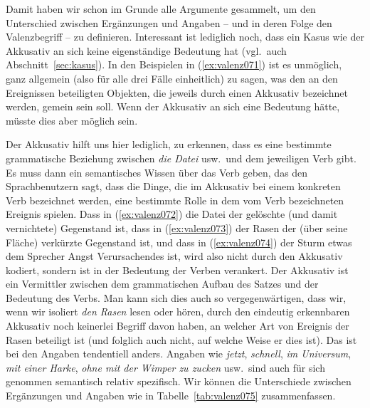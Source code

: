 \begin{exe}
  \ex\label{ex:valenz070}
  \begin{xlist}
  \end{xlist}
\end{exe}


Damit haben wir schon im Grunde alle Argumente gesammelt, um den Unterschied zwischen Ergänzungen und Angaben -- und in deren Folge den Valenzbegriff -- zu definieren.
Interessant ist lediglich noch, dass ein Kasus wie der Akkusativ an sich keine eigenständige Bedeutung hat (vgl.\ auch Abschnitt~\ref{sec:kasus}).
In den Beispielen in (\ref{ex:valenz071}) ist es unmöglich, ganz allgemein (also für alle drei Fälle einheitlich) zu sagen, was den an den Ereignissen beteiligten Objekten, die jeweils durch einen Akkusativ bezeichnet werden, gemein sein soll.
Wenn der Akkusativ an sich eine Bedeutung hätte, müsste dies aber möglich sein.


\begin{exe}
  \ex\label{ex:valenz071}
  \begin{xlist}
  \end{xlist}
\end{exe}


Der Akkusativ hilft uns hier lediglich, zu erkennen, dass es eine bestimmte grammatische Beziehung zwischen \textit{die Datei} usw.\ und dem jeweiligen Verb gibt.
Es muss dann ein semantisches Wissen über das Verb geben, das den Sprachbenutzern sagt, dass die Dinge, die im Akkusativ bei einem konkreten Verb bezeichnet werden, eine bestimmte Rolle in dem vom Verb bezeichneten Ereignis spielen.
Dass in (\ref{ex:valenz072}) die Datei der gelöschte (und damit vernichtete) Gegenstand ist, dass in (\ref{ex:valenz073}) der Rasen der (über seine Fläche) verkürzte Gegenstand ist, und dass in (\ref{ex:valenz074}) der Sturm etwas dem Sprecher Angst Verursachendes ist, wird also nicht durch den Akkusativ kodiert, sondern ist in der Bedeutung der Verben verankert.
Der Akkusativ ist ein Vermittler zwischen dem grammatischen Aufbau des Satzes und der Bedeutung des Verbs.
Man kann sich dies auch so vergegenwärtigen, dass wir, wenn wir isoliert \textit{den Rasen} lesen oder hören, durch den eindeutig erkennbaren Akkusativ noch keinerlei Begriff davon haben, an welcher Art von Ereignis der Rasen beteiligt ist (und folglich auch nicht, auf welche Weise er dies ist).
Das ist bei den Angaben tendentiell anders.
Angaben wie \textit{jetzt}, \textit{schnell}, \textit{im Universum}, \textit{mit einer Harke}, \textit{ohne mit der Wimper zu zucken} usw.\ sind auch für sich genommen semantisch relativ spezifisch.
Wir können die Unterschiede zwischen Ergänzungen und Angaben wie in Tabelle~\ref{tab:valenz075} zusammenfassen.

